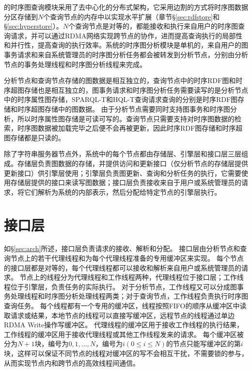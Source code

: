 \sys 的时序图查询模块采用了去中心化的分布式架构，它采用边割\cite{edgecut}的方式将时序图数据分区存储到$N$个查询节点的内存中以实现水平扩展（章节\S\ref{sec:rdfstore}和\S\ref{sec:hyperstore}）。$N$个查询节点是对等的，都能接收和执行来自用户的时序图查询请求，并可以通过RDMA网络实现跨节点的协作，进而提高查询执行的局部性和并行性，提高查询的执行效率。系统的时序图分析模块是单机的，来自用户的图事务请求和来自系统管理员的时序图分析任务都会被转发到分析节点，分别由分析节点的事务处理线程和时序图分析线程来完成。

分析节点和查询节点存储的图数据是相互独立的，查询节点中的时序RDF图和时序超图存储也是相互独立的，图事务请求和时序图分析任务需要读写的是分析节点中的时序属性图存储，SPARQL-T和HQL-T查询请求查询的分别是时序RDF图存储和时序超图存储中的图数据。
由于分析节点需要同时支持图事务和时序图分析，所以时序属性图存储是可读可写的。查询节点只需要支持对时序图数据的检索，时序图数据被加载完毕之后便不会再被更新，因此时序RDF图存储和时序超图存储都是只读的。

除了字符串服务器节点外，系统中的每个节点都由存储层、引擎层和接口层三层组成。存储层负责图数据的存储，并提供访问和更新接口（仅分析节点的存储层提供更新接口）供引擎层使用；引擎层负责图更新、查询和分析任务的执行，它需要使用存储层提供的接口来读写图数据；接口层负责接收来自于用户或系统管理员的请求，将它们解析为系统的内部表示，然后分配给特定节点的引擎层执行。

\section{接口层}
\label{chap:interface}
如\S\ref{sec:arch}所述，接口层负责请求的接收、解析和分配。
接口层由分析节点和查询节点上的若干代理线程和为每个代理线程准备的专用缓冲区来实现。
每个节点的接口层都是对等的，每个代理线程都可以接收和解析来自用户或系统管理员的请求。
节点上的线程分为代理线程和工作线程两种，代理线程位于接口层；工作线程位于引擎层，负责任务的实际执行。
对于分析节点，工作线程又可以分成图事务处理线程和时序图分析处理线程两类；对于查询节点，工作线程负责执行时序图查询任务。
每个线程都有一个专用的缓冲区，线程按照FIFO的顺序从缓冲区中读取请求或结果，本地节点的线程可以直接写缓冲区，远程节点的线程通过单边RDMA Write操作写缓冲区。
代理线程的缓冲区用于接收工作线程的执行结果，工作线程的缓冲区用于接收代理线程或其他工作线程发来的请求。
每个缓冲区被分为$N+1$块，编号为$0, 1, ..., N$，编号为$i (0\leq i \leq N)$的节点只能写缓冲区的第$i$块，这样可以保证不同节点的线程对缓冲区的写不会相互干扰，不需要锁的参与，从而实现节点内和跨节点的高效线程间通信。

